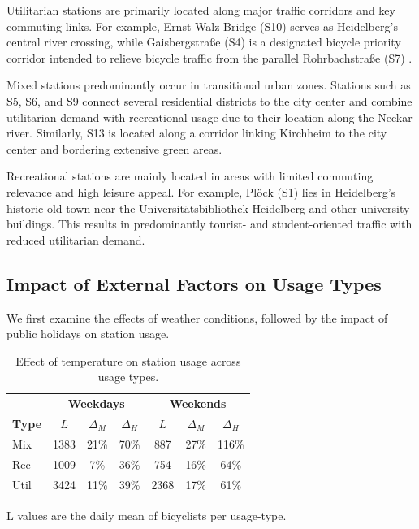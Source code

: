 \documentclass{article}
\begin{document}
Utilitarian stations are primarily located along major traffic corridors and key commuting links.
For example, Ernst-Walz-Bridge (S10) serves as Heidelberg’s central river crossing, while Gaisbergstraße (S4) is a designated bicycle priority corridor intended to relieve bicycle traffic from the parallel Rohrbachstraße (S7) \cite{adfc_heidelberg_fahrradstrassen}.


Mixed stations predominantly occur in transitional urban zones.
Stations such as S5, S6, and S9 connect several residential districts to the city center and combine utilitarian demand with recreational usage due to their location along the Neckar river.
Similarly, S13 is located along a corridor linking Kirchheim to the city center and bordering extensive green areas.


Recreational stations are mainly located in areas with limited commuting relevance and high leisure appeal. For example, Plöck (S1) lies in Heidelberg’s historic old town near the Universitätsbibliothek Heidelberg and other university buildings. 
This results in predominantly tourist- and student-oriented traffic with reduced utilitarian demand.


\subsection{Impact of External Factors on Usage Types}\label{sec:results_external}
We first examine the effects of weather conditions, followed by the impact of public holidays on station usage.

\begin{table}[t]
\centering
\caption{Effect of temperature on station usage across usage types.}
\label{tab:temperature_effect}
\small
\begin{tabularx}{\linewidth}{l*{6}{c}}
\toprule
 & \multicolumn{3}{c}{\textbf{Weekdays}} 
 & \multicolumn{3}{c}{\textbf{Weekends}} \\
\textbf{Type}
 & $L$ & $\Delta_M$ & $\Delta_H$
 & $L$ & $\Delta_M$ & $\Delta_H$ \\
\midrule
Mix
& 1383 & 21\% & 70\%
& 887  & 27\% & 116\% \\

Rec
& 1009 & 7\%  & 36\%
& 754  & 16\% & 64\% \\

Util
& 3424 & 11\% & 39\%
& 2368 & 17\% & 61\% \\
\bottomrule
\end{tabularx}

\vspace{2pt}
{\footnotesize
L values are the daily mean of bicyclists per usage-type.
}
\end{table}
\end{document}
